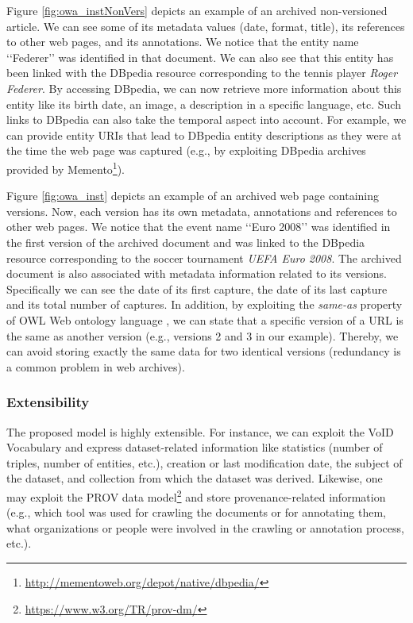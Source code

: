 \documentclass[twocolumn]{svjour3}
\newcommand{\q}[1]{\lq\lq{}{}#1\rq\rq{}{}}
\begin{document}
Figure \ref{fig:owa_instNonVers} depicts an example of an archived non-versioned article.
We can see some of its metadata values (date, format, title),
its references to other web pages, and its annotations.
We notice that the entity name \q{Federer} was identified
in that document.
We can also see that this entity has been linked with the DBpedia resource
corresponding to the tennis player {\em Roger Federer}.
By accessing DBpedia, we can now retrieve more information about this entity
like its birth date, an image, a description in a specific language, etc.
Such links to DBpedia can also take the temporal aspect into account.
For example, we can provide entity URIs that lead to DBpedia entity descriptions
as they were at the time the web page was captured
(e.g., by exploiting DBpedia archives provided by Memento\footnote{\url{http://mementoweb.org/depot/native/dbpedia/}}).

Figure \ref{fig:owa_inst} depicts an example of an archived web page containing versions.
Now, each version has its own metadata, annotations and references to other web pages.
We notice that the event name \q{Euro 2008} was identified in the first version of the archived document
and was linked to the DBpedia resource corresponding to the soccer tournament {\em UEFA Euro 2008}.
The archived document is also associated with metadata information related to its versions.
Specifically we can see the date of its first capture, the date of its last capture and
its total number of captures.
In addition, by exploiting the {\em same-as} property of OWL Web ontology language \cite{bechhofer2009owl},
we can state that a specific version of a URL is the same as another version
(e.g., versions 2 and 3 in our example).
Thereby, we can avoid storing exactly the same data for two identical versions
(redundancy is a common problem in web archives).


\subsubsection*{Extensibility}
The proposed model is highly extensible.
For instance, we can
exploit the VoID Vocabulary \cite{alexander2009describing}
and express dataset-related information like
statistics (number of triples, number of entities, etc.),
creation or last modification date,
the subject of the dataset, and
collection from which the dataset was derived.
Likewise, one may exploit the PROV data model\footnote{\url{https://www.w3.org/TR/prov-dm/}}
and store provenance-related information
(e.g., which tool was used for crawling the documents or for annotating them,
what organizations or people were involved in the crawling or annotation process,
etc.).
\end{document}

